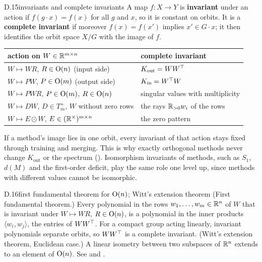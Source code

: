 \begin{bgentry}{D.15}{invariants and complete invariants}
A map $f:X\to Y$ is \textbf{invariant} under an action if $f(g\cdot x)=f(x)$ for all $g$ and $x$, so it is constant on
orbits. It is a \textbf{complete invariant} if moreover $f(x)=f(x')$ implies $x'\in G\cdot x$; it then identifies the
orbit space $X/G$ with the image of $f$.

\smallskip
{\centering\small\renewcommand{\arraystretch}{1.12}
\begin{tabularx}{\linewidth}{@{}XX@{}}
  \toprule
  \headrow \textbf{action on $W\in\mathbb{R}^{m\times n}$} & \textbf{complete invariant}\\
  \midrule
  $W\mapsto WR$, $R\in\mathrm{O}(n)$ (input side) & $K_{\mathrm{out}}=WW^{\top}$\\
  $W\mapsto PW$, $P\in\mathrm{O}(m)$ (output side) & $K_{\mathrm{in}}=W^{\top} W$\\
  $W\mapsto PWR$, $P\in\mathrm{O}(m)$, $R\in\mathrm{O}(n)$ & singular values with multiplicity\\
  $W\mapsto DW$, $D\in T_m^+$, $W$ without zero rows & the rays $\mathbb{R}_{>0}w_i$ of the rows\\
  $W\mapsto E\odot W$, $E\in(\mathbb{R}^\times)^{m\times n}$ & the zero pattern\\
  \bottomrule
\end{tabularx}\par}
\end{bgentry}

If a method's image lies in one orbit, every invariant of that action stays fixed through training and merging. This is
why exactly orthogonal methods never change $K_{\mathrm{out}}$ or the spectrum (). Isomorphism
invariants of methods, such as $S_1$, $d(M)$ and the first-order deficit, play the same role one level up, since methods
with different values cannot be isomorphic.


\begin{bgfact}{D.16}{first fundamental theorem for $\mathrm{O}(n)$; Witt's extension theorem}
(First fundamental theorem.) Every polynomial in the rows $w_1,\dots,w_m\in\mathbb{R}^n$ of $W$ that is invariant under
$W\mapsto WR$, $R\in\mathrm{O}(n)$, is a polynomial in the inner products $\langle w_i,w_j\rangle$, the entries of $WW^{\top}$. For
a compact group acting linearly, invariant polynomials separate orbits, so $WW^{\top}$ is a complete invariant. (Witt's
extension theorem, Euclidean case.) A linear isometry between two subspaces of $\mathbb{R}^n$ extends to an element of
$\mathrm{O}(n)$. See \citet[Ch.~II]{xweyl1939classical} and \citet[Ch.~5]{xgoodman2009symmetry}.
\end{bgfact}

